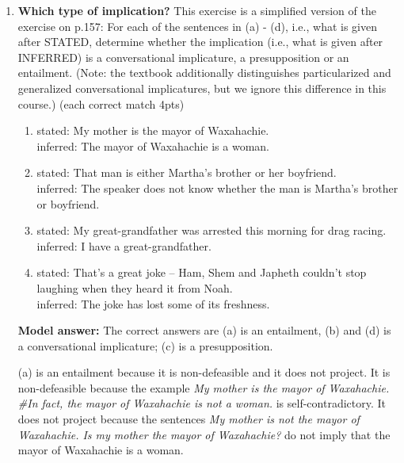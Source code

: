 \documentclass[a4,11pt]{article}
\newcommand{\6}{\mbox{$[\hspace*{-.6mm}[$}}
\newcommand{\9}{\mbox{$]\hspace*{-.6mm}]$}}
\begin{document}
\begin{enumerate}[leftmargin = 12pt]
{ \bf Model answer:} As per CC p.28, implicatures are defeasible and reinforceable. Entailments are not defeasible nor reinforceable and they do not project over entailment-cancelling operators. Presuppositions are not defeasible nor reinforceable but they do project over entailment-cancelling operators. 

\item  { \bf Which type of implication?} This exercise is a simplified version of the exercise on p.157: For each of the sentences in (a) - (d), i.e., what is given after STATED, determine whether the implication (i.e., what is given after INFERRED) is a conversational implicature, a presupposition or an entailment. (Note: the textbook additionally distinguishes particularized and generalized conversational implicatures, but we ignore this difference in this course.) (each correct match 4pts)


\begin{enumerate}[noitemsep]
\item stated: My mother is the mayor of Waxahachie. \\ 
	inferred: The mayor of Waxahachie is a woman.
\item stated:  That man is either Martha’s brother or her boyfriend.  \\
	inferred: The speaker does not know whether the man is Martha’s brother or boyfriend.
\item stated:  My great-grandfather was arrested this morning for drag racing. \\  
	inferred:  I have a great-grandfather.
\item stated: That’s a great joke – Ham, Shem and Japheth couldn’t stop laughing when they heard it from Noah. \\  
	inferred: The joke has lost some of its freshness.
\end{enumerate}


{ \bf Model answer:} The correct answers are (a) is an entailment, (b) and (d) is a conversational implicature; (c) is a presupposition. 

(a) is an entailment because it is non-defeasible and it does not project. It is non-defeasible because the example {\it My mother is the mayor of Waxahachie. \#In fact, the mayor of Waxahachie is not a woman.} is self-contradictory. It does not project because the sentences  {\it My mother is not the mayor of Waxahachie. Is my mother the mayor of Waxahachie?} do not imply that the mayor of Waxahachie is a woman.


\end{enumerate}
\end{document}
